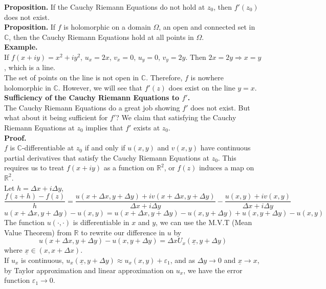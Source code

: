 \documentclass[11pt]{article}
\begin{document}
\textbf{Proposition.} If the Cauchy Riemann Equations do not hold at $z_0$, then $f'(z_0)$ does not exist. \\
\textbf{Proposition.} If $f$ is holomorphic on a domain $\Omega$, an open and connected set in $\mathbb{C}$, then the Cauchy Riemann Equations hold at all points in $\Omega$. \\
\newline
\textbf{Example.} \\
If $f(x + iy) = x^2 + iy^2$, $u_x = 2x$, $v_x = 0$, $u_y = 0$, $v_y = 2y$. Then $2x = 2y \Rightarrow x = y$, which is a line. \\
The set of points on the line is not open in $\mathbb{C}$. Therefore, $f$ is nowhere holomorphic in $\mathbb{C}$. However, we will see that $f'(z)$ does exist on the line $y = x$. \\
\newline
\textbf{Sufficiency of the Cauchy Riemann Equations to $f'$.} \\
The Cauchy Riemann Equations do a great job showing $f'$ does not exist. But what about it being sufficient for $f'$? We claim that satisfying the Cauchy Riemann Equations at $z_0$ implies that $f'$ exists at $z_0$. \\
\textbf{Proof.} \\
$f$ is $\mathbb{C}$-differentiable at $z_0$ if and only if $u(x, y)$ and $v(x, y)$ have continuous partial derivatives that satisfy the Cauchy Riemann Equations at $z_0$. 
This requires us to treat $f(x + iy)$ as a function on $\mathbb{R} ^ 2$, or $f(z)$ induces a map on $\mathbb{R} ^ 2$. \\
Let $ h = \Delta x + i\Delta y$, 
$$ \frac{f(z + h) - f(z)}{h} = \frac{u(x + \Delta x, y + \Delta y) + iv(x + \Delta x, y + \Delta y)}{\Delta x + i \Delta y} - \frac{u(x, y) + iv(x, y)}{\Delta x + i \Delta y}$$
$$u(x + \Delta x, y + \Delta y) - u(x, y) = u(x + \Delta x, y + \Delta y) - u(x, y + \Delta y) + u(x, y + \Delta y) - u(x, y)$$ 
The function $u(\cdot, \cdot)$ is differentiable in $x$ and $y$, we can use the M.V.T (Mean Value Theorem) from $\mathbb{R}$ to rewrite our difference in $u$ by \\
$$u(x + \Delta x, y + \Delta y) - u(x, y + \Delta y) = \Delta xU_x(\underline x, y + \Delta y)$$
where $\underline x \in (x, x + \Delta x)$. \\
\newline 
If $u_x$ is continuous, $u_x(\underline x, y + \Delta y) \approx u_x(x, y) + \varepsilon_1$, and as $\Delta y \to 0$ and $\underline x \to x$, by Taylor approximation and linear approximation on $u_x$, we have the error function $\varepsilon_1 \to 0$. \\
\end{document}
